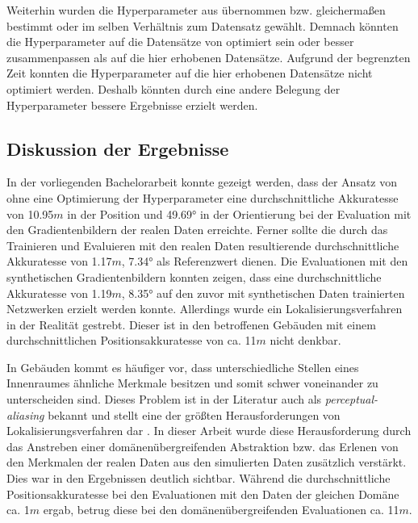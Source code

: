 Weiterhin wurden die Hyperparameter aus \citet{acharyaBIMPoseNetIndoorCamera2019} übernommen bzw. gleichermaßen bestimmt oder im selben Verhältnis zum Datensatz gewählt. Demnach könnten die Hyperparameter auf die Datensätze von \citet{acharyaBIMPoseNetIndoorCamera2019} optimiert sein oder besser zusammenpassen als auf die hier erhobenen Datensätze. Aufgrund der begrenzten Zeit konnten die Hyperparameter auf die hier erhobenen Datensätze nicht optimiert werden. Deshalb könnten durch eine andere Belegung der Hyperparameter bessere Ergebnisse erzielt werden.

\subsection{Diskussion der Ergebnisse}



In der vorliegenden Bachelorarbeit konnte gezeigt werden, dass der Ansatz von \citet{acharyaBIMPoseNetIndoorCamera2019} ohne eine Optimierung der Hyperparameter eine durchschnittliche Akkuratesse von 10.95$m$ in der Position und 49.69° in der Orientierung bei der Evaluation mit den Gradientenbildern der realen Daten erreichte. Ferner sollte die durch das Trainieren und Evaluieren mit den realen Daten resultierende durchschnittliche Akkuratesse von 1.17$m$, 7.34° als Referenzwert dienen. Die Evaluationen mit den synthetischen Gradientenbildern konnten zeigen, dass eine durchschnittliche Akkuratesse von 1.19$m$, 8.35° auf den zuvor mit synthetischen Daten trainierten Netzwerken erzielt werden konnte. Allerdings wurde ein Lokalisierungsverfahren in der Realität gestrebt. Dieser ist in den betroffenen Gebäuden mit einem durchschnittlichen Positionsakkuratesse von ca. 11$m$ nicht denkbar. 

In Gebäuden kommt es häufiger vor, dass unterschiedliche Stellen eines Innenraumes ähnliche Merkmale besitzen und somit schwer voneinander zu unterscheiden sind. Dieses Problem ist in der Literatur auch als \textit{perceptual-aliasing} bekannt und stellt eine der größten Herausforderungen von Lokalisierungsverfahren dar \cite{lowryVisualPlaceRecognition2016}. In dieser Arbeit wurde diese Herausforderung durch das Anstreben einer domänenübergreifenden Abstraktion bzw. das Erlenen von den Merkmalen der realen Daten aus den simulierten Daten zusätzlich verstärkt. Dies war in den Ergebnissen deutlich sichtbar. Während die durchschnittliche Positionsakkuratesse bei den Evaluationen mit den Daten der gleichen Domäne ca. 1$m$ ergab, betrug diese bei den domänenübergreifenden Evaluationen ca. 11$m$.

